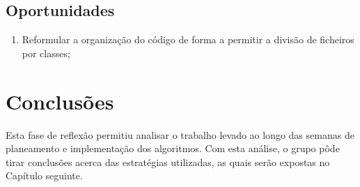 \subsection{Oportunidades}
\label{ssec::reflexao:critica:oportunidades}

\begin{enumerate}
	\item Reformular a organização do código de forma a permitir a divisão de ficheiros por classes;
\end{enumerate}


\section{Conclusões}
\label{sec::reflexao:conclusao}

Esta fase de reflexão permitiu analisar o trabalho levado ao longo das semanas de planeamento e implementação dos algoritmos. Com esta análise, o grupo pôde tirar conclusões acerca das estratégias utilizadas, as quais serão expostas no Capítulo seguinte.
